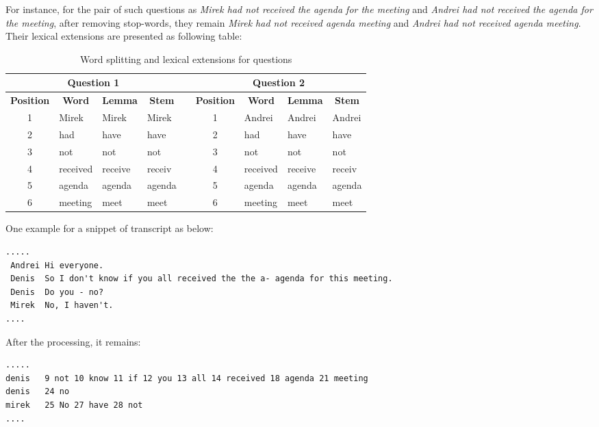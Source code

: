 For instance, for the pair of such questions as \textit{Mirek had not received the agenda for the meeting} and \textit{Andrei had not received the agenda for the meeting}, after removing stop-words, they remain \textit{Mirek had not received agenda meeting} and \textit{Andrei had not received agenda meeting}. Their lexical extensions are presented as following table:
\begin{table}[htbp]
\scriptsize
\caption{Word splitting and lexical extensions for questions}
\begin{tabular}{|c|l|l|l|l|c|l|l|l|}
\hline
\multicolumn{ 4}{|c|}{\textbf{Question 1}} &  & \multicolumn{ 4}{c|}{\textbf{Question 2}} \\ \hline
\textbf{Position} & \multicolumn{1}{c|}{\textbf{Word}} & \multicolumn{1}{c|}{\textbf{Lemma}} & \multicolumn{1}{c|}{\textbf{Stem}} &  & \textbf{Position} & \multicolumn{1}{c|}{\textbf{Word}} & \multicolumn{1}{c|}{\textbf{Lemma}} & \multicolumn{1}{c|}{\textbf{Stem}} \\ \hline
1 & Mirek & Mirek & Mirek &  & 1 & Andrei & Andrei & Andrei \\ \hline
2 & had & have & have &  & 2 & had & have & have \\ \hline
3 & not & not & not &  & 3 & not & not & not \\ \hline
4 & received & receive & receiv &  & 4 & received & receive & receiv \\ \hline
5 & agenda & agenda & agenda &  & 5 & agenda & agenda & agenda \\ \hline
6 & meeting & meet & meet &  & 6 & meeting & meet & meet \\ \hline
\end{tabular}
\label{Word splitting and lexical extensions for questions}
\end{table}

\normalsize



One example for a snippet of transcript as below:
\scriptsize
\begin{verbatim}
.....
 Andrei Hi everyone. 
 Denis  So I don't know if you all received the the a- agenda for this meeting.
 Denis 	Do you - no?
 Mirek 	No, I haven't.
....
\end{verbatim}
\normalsize

After the processing, it remains:
\scriptsize
\begin{verbatim}
.....
denis   9 not 10 know 11 if 12 you 13 all 14 received 18 agenda 21 meeting
denis   24 no 
mirek   25 No 27 have 28 not
....
\end{verbatim}
\normalsize

